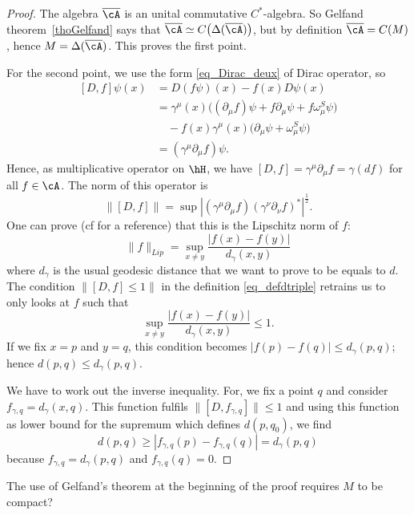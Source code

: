\begin{proof}
The algebra $\overline{ \cA }$ is an unital commutative $C^*$-algebra. So Gelfand theorem~\ref{thoGelfand} says that $\overline{ \cA }\simeq C\big( \Delta(\overline{ \cA }) \big)$, but by definition $\overline{\cA}=C(M)$, hence $M=\Delta(\overline{ \cA })$. This proves the first point.

For the second point, we use the form \eqref{eq_Dirac_deux} of Dirac operator, so
 \begin{equation}
\begin{split}
[D,f]\psi(x)&=D(f\psi)(x)-f(x)D\psi(x)\\
	&=\gamma^{\mu}(x)\big( (\partial_{\mu}f)\psi+f\partial_{\mu}\psi+f\omega_{\mu}^S\psi \big)\\
	&\quad -f(x)\gamma^{\mu}(x)\big( \partial_{\mu}\psi+\omega_{\mu}^S\psi \big)\\
	&=(\gamma^{\mu}\partial_{\mu}f)\psi.
\end{split}
\end{equation}
Hence, as multiplicative operator on $\hH$, we have $[D,f]=\gamma^{\mu}\partial_{\mu}f=\gamma(df)$ for all $f\in\cA$. The norm of this operator is
\[
  \| [D,f] \|=\sup | (\gamma^{\mu}\partial_{\mu}f)(\gamma^{\nu}\partial_{\nu}f)^* |^{\frac{ 1 }{2}}.
\]
One can prove (cf \cite{Landi} for a reference) that this is the Lipschitz norm of $f$:
\[
  \| f \|_{Lip}=\sup_{x\neq y}\frac{ | f(x)-f(y) | }{ d_{\gamma}(x,y) }
\]
where $d_{\gamma}$ is the usual geodesic distance that we want to prove to be equals to $d$. The condition $\| [D,f]\leq 1 \|$ in the definition  \eqref{eq_defdtriple} retrains us to only looks at $f$ such that
\[
  \sup_{x\neq y}\frac{ | f(x)-f(y) | }{ d_{\gamma}(x,y) }\leq 1.
\]
If we fix $x=p$ and $y=q$, this condition becomes $| f(p)-f(q) |\leq d_{\gamma}(p,q)$; hence $d(p,q)\leq d_{\gamma}(p,q)$.

We have to work out the inverse inequality. For, we fix a point $q$ and consider $f_{\gamma,q}=d_{\gamma}(x,q)$. This function fulfils $\| [D,f_{\gamma,q}] \| \leq 1$ and using this function as lower bound for the supremum which defines $d(p,q_0)$, we find
\[
  d(p,q)\geq | f_{\gamma,q}(p)-f_{\gamma,q}(q) |=d_{\gamma}(p,q)
\]
because $f_{\gamma,q}=d_{\gamma}(p,q)$ and $f_{\gamma,q}(q)=0$.

\end{proof}

\begin{probleme}
	The use of Gelfand's theorem at the beginning of the proof requires $M$ to be compact?
\end{probleme}

